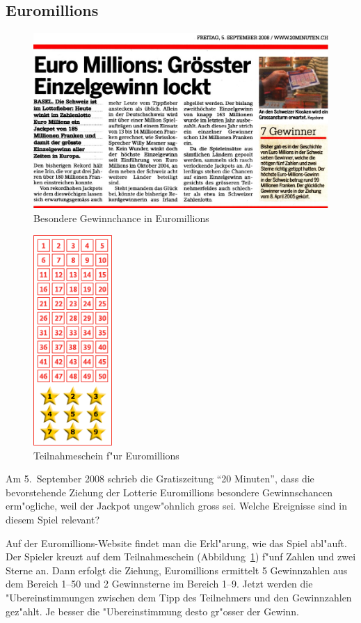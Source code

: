 \subsection{Euromillions}
\begin{figure}
\includegraphics[width=\hsize]{graphics/euromillions}
\caption{Besondere Gewinnchance in Euromillions}
\end{figure}
\begin{figure}
\begin{center}
\includegraphics[height=8cm]{graphics/euromillionsschein}
\end{center}
\caption{Teilnahmeschein f"ur Euromillions\label{euromillionsschein}}
\end{figure}
Am 5.~September 2008 schrieb die Gratiszeitung ``20 Minuten'', dass die
bevorstehende Ziehung der Lotterie Euromillions besondere Gewinnschancen 
erm"ogliche, weil der Jackpot ungew"ohnlich gross sei. Welche Ereignisse
sind in diesem Spiel relevant?

Auf der Euromillions-Website findet man die Erkl"arung, wie das Spiel abl"auft.
Der Spieler kreuzt auf dem Teilnahmeschein (Abbildung~\ref{euromillionsschein})
f"unf Zahlen und zwei Sterne an. Dann erfolgt die Ziehung, Euromillions ermittelt
5 Gewinnzahlen aus dem Bereich 1--50 und 2 Gewinnsterne im Bereich 1--9.
Jetzt werden die "Ubereinstimmungen zwischen dem Tipp des Teilnehmers und den
Gewinnzahlen gez"ahlt. Je besser die "Ubereinstimmung desto gr"osser der Gewinn.

